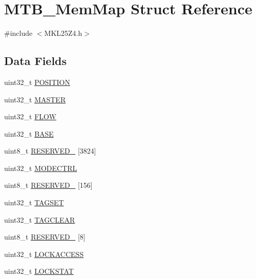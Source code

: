 \hypertarget{struct_m_t_b___mem_map}{}\section{M\+T\+B\+\_\+\+Mem\+Map Struct Reference}
\label{struct_m_t_b___mem_map}


{\ttfamily \#include $<$M\+K\+L25\+Z4.\+h$>$}

\subsection*{Data Fields}
\begin{DoxyCompactItemize}
\item 
uint32\+\_\+t \hyperlink{struct_m_t_b___mem_map_af02973e301b85c6ea0c6ba7520b59173}{P\+O\+S\+I\+T\+I\+ON}
\item 
uint32\+\_\+t \hyperlink{struct_m_t_b___mem_map_a4398e867901c87b7b9d86f7a4730d1c2}{M\+A\+S\+T\+ER}
\item 
uint32\+\_\+t \hyperlink{struct_m_t_b___mem_map_a69ea771a865eb621e80af63894c65982}{F\+L\+OW}
\item 
uint32\+\_\+t \hyperlink{struct_m_t_b___mem_map_a11667e8893e740c2275248dafcc874ed}{B\+A\+SE}
\item 
uint8\+\_\+t \hyperlink{struct_m_t_b___mem_map_a172ff600859c461e34dc403b3a6dc3ed}{R\+E\+S\+E\+R\+V\+E\+D\+\_} \mbox{[}3824\mbox{]}
\item 
uint32\+\_\+t \hyperlink{struct_m_t_b___mem_map_afb3fb2741fa86e77bf0e514f4d4dc96e}{M\+O\+D\+E\+C\+T\+RL}
\item 
uint8\+\_\+t \hyperlink{struct_m_t_b___mem_map_a404eebe408f9386a32efe60d533a89ea}{R\+E\+S\+E\+R\+V\+E\+D\+\_} \mbox{[}156\mbox{]}
\item 
uint32\+\_\+t \hyperlink{struct_m_t_b___mem_map_a5709bb3455f82d56406ad14e3a8c182e}{T\+A\+G\+S\+ET}
\item 
uint32\+\_\+t \hyperlink{struct_m_t_b___mem_map_a341492ac466b6c26b188093417006f72}{T\+A\+G\+C\+L\+E\+AR}
\item 
uint8\+\_\+t \hyperlink{struct_m_t_b___mem_map_a6a9efecd836ca4d1dd3d7058600f042e}{R\+E\+S\+E\+R\+V\+E\+D\+\_} \mbox{[}8\mbox{]}
\item 
uint32\+\_\+t \hyperlink{struct_m_t_b___mem_map_a6fea4948a50a4c0283e2fe15468ddb41}{L\+O\+C\+K\+A\+C\+C\+E\+SS}
\item 
uint32\+\_\+t \hyperlink{struct_m_t_b___mem_map_aac267fb66879aa477f7e0185507d688b}{L\+O\+C\+K\+S\+T\+AT}
\item 

\end{DoxyCompactItemize}
